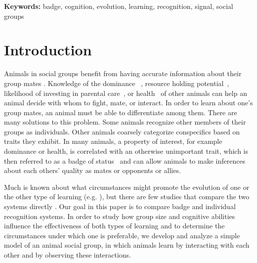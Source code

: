 \textbf{Keywords:} badge, cognition, evolution, learning, recognition, signal, social groups

\newpage
\section*{Introduction} 
Animals in social groups benefit from having accurate information about their group mates \citep{Seyfarth:2010bh}. Knowledge of the dominance ~\citep{Waal:1986ys,Cowlishaw:1990vn,Bergman:2003qf,Seyfarth:2005ve,Flack:2006uq,Hobson:2015uq}, resource holding potential~\citep{Rhijn:1980uq,Freeman:1985kl,Dick:1990cr,Lemel:1993ve}, likelihood of investing in parental care~\citep{Qvarnstrom:1997fk,Olsen:2010uq}, or health~\citep{Folstad:1992kx,Loyau:2005nx} of other animals can help an animal decide with whom to fight, mate, or interact. In order to learn about one's group mates, an animal must be able to differentiate among them. There are many solutions to this problem. Some animals recognize other members of their groups as individuals. Other animals coarsely categorize conspecifics based on traits they exhibit. In many animals, a property of interest, for example dominance or health, is correlated with an otherwise unimportant trait, which is then referred to as a badge of status~\citep{dawkins1978signals,Rohwer:1981vn,Rohwer:1982fk} and can allow animals to make inferences about each others' quality as mates or opponents or allies. 

Much is known about what circumstances might promote the evolution of one or the other type of learning (e.g. \citep{Whitfield:1987tg,Rohwer:1975fk,Lemel:1993ve,Solberg:1997uq,Tibbetts:2009kx,Remy:2010fk,Sheehan:2014fk}), but there are few studies that compare the two systems directly \citep{sheehan2016evotradeoff}. Our goal in this paper is to compare badge and individual recognition systems. In order to study how group size and cognitive abilities influence the effectiveness of both types of learning and to determine the circumstances under which one is preferable, we develop and analyze a simple model of an animal social group, in which animals learn by interacting with each other and by observing these interactions.  


